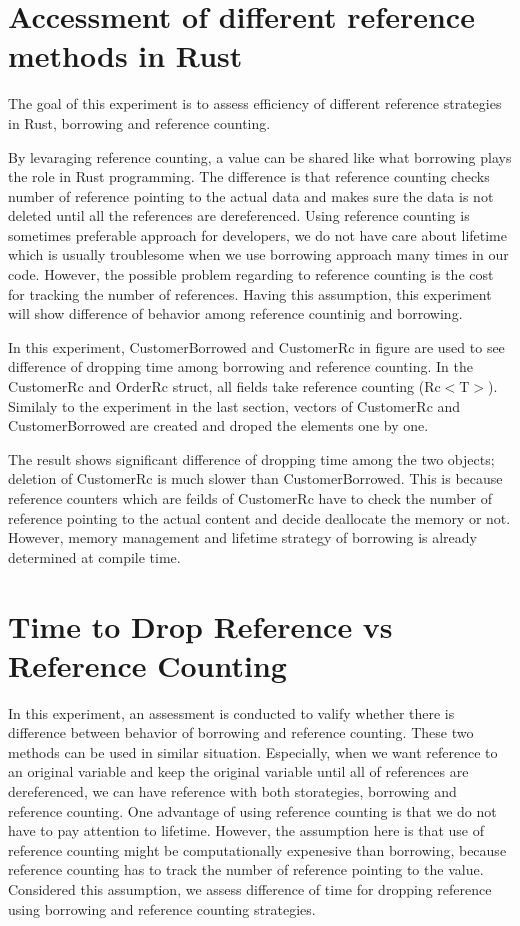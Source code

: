 \section{Accessment of different reference methods in Rust}
\label{sec:history}
The goal of this experiment is to assess efficiency of different reference strategies in Rust, borrowing and reference counting. 

By levaraging reference counting, a value can be shared like what borrowing plays the role in Rust programming. 
The difference is that reference counting checks number of reference pointing to the actual data and makes sure the data is not deleted 
until all the references are dereferenced. Using reference counting is sometimes preferable approach for developers, 
we do not have care about lifetime which is usually troublesome when we use borrowing approach many times in our code. 
However, the possible problem regarding to reference counting is the cost for tracking the number of references. 
Having this assumption, this experiment will show difference of behavior among reference countinig and borrowing.

In this experiment, CustomerBorrowed and CustomerRc in figure are used to see difference of dropping time among borrowing and reference counting. 
In the CustomerRc and OrderRc struct, all fields take reference counting (Rc$<$T$>$). Similaly to the experiment in the last section, 
vectors of CustomerRc and CustomerBorrowed are created and droped the elements one by one. 

The result shows significant difference of dropping time among the two objects; deletion of CustomerRc is much slower than CustomerBorrowed. 
This is because reference counters which are feilds of CustomerRc have to check the number of reference pointing to the actual content and decide 
deallocate the memory or not. However, memory management and lifetime strategy of borrowing is already determined at compile time.

\section{Time to Drop Reference vs Reference Counting}
\label{sec:history}
In this experiment, an assessment is conducted to valify whether there is difference between behavior of borrowing and reference counting. 
These two methods can be used in similar situation. Especially, when we want reference to an original variable and keep the original variable until all of references are dereferenced, 
we can have reference with both storategies, borrowing and reference counting. One advantage of using reference counting is that we do not have to pay attention to lifetime.
However, the assumption here is that use of reference counting might be computationally expenesive than borrowing, because reference counting has to track the number of reference pointing to the value. 
Considered this assumption, we assess difference of time for dropping reference using borrowing and reference counting strategies. 

